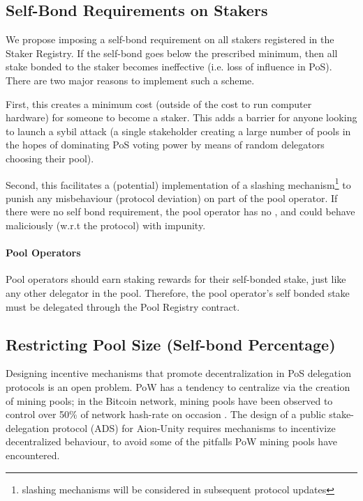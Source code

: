 \subsection{Self-Bond Requirements on Stakers} \label{self_bond}
We propose imposing a self-bond requirement on all stakers registered in the Staker Registry. If the self-bond goes below the prescribed minimum, then all stake bonded to the staker becomes ineffective (i.e. loss of influence in PoS). There are two major reasons to implement such a scheme.

First, this creates a minimum cost (outside of the cost to run computer hardware) for someone to become a staker. This adds a barrier for anyone looking to launch a sybil attack (a single stakeholder creating a large number of pools in the hopes of dominating PoS voting power by means of random delegators choosing their pool). 
 
Second, this facilitates a (potential) implementation of a slashing mechanism\footnote{slashing mechanisms will be considered in subsequent protocol updates} to punish any misbehaviour (protocol deviation) on part of the pool operator. If there were no self bond requirement, the pool operator has no , and could behave maliciously (w.r.t the protocol) with impunity. 

\paragraph{Pool Operators} Pool operators should earn staking rewards for their self-bonded stake, just like any other delegator in the pool. Therefore, the pool operator's self bonded stake must be delegated through the Pool Registry contract. 

\subsection{Restricting Pool Size (Self-bond Percentage)} \label{self_bond_percentage}
Designing incentive mechanisms that promote decentralization in PoS delegation protocols is an open problem. PoW has a tendency to centralize via the creation of mining pools; in the Bitcoin network, mining pools have been observed to control over 50\% of network hash-rate on occasion \cite{RJZ+19}. The design of a public stake-delegation protocol (ADS) for Aion-Unity requires mechanisms to incentivize decentralized behaviour, to avoid some of the pitfalls PoW mining pools have encountered. 

